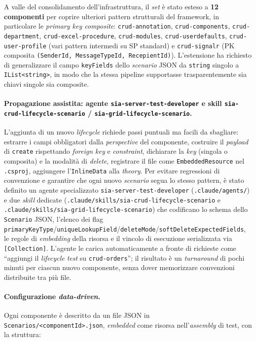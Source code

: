 A valle del consolidamento dell'infrastruttura, il \emph{set} è stato esteso a \textbf{12 componenti} per coprire ulteriori pattern strutturali del framework, in particolare le \emph{primary key composite}: \texttt{crud-annotation}, \texttt{crud-components}, \texttt{crud-department}, \texttt{crud-excel-procedure}, \texttt{crud-modules}, \texttt{crud-userdefaults}, \texttt{crud-user-profile} (vari pattern intermedi su SP standard) e \texttt{crud-signalr} (PK composita \texttt{(SenderId, MessageTypeId, RecepientId)}). L'estensione ha richiesto di generalizzare il campo \texttt{keyFields} dello \emph{scenario} JSON da \texttt{string} singolo a \texttt{IList<string>}, in modo che la stessa pipeline supportasse trasparentemente sia chiavi singole sia composite.

\paragraph{Propagazione assistita: agente \texttt{sia-server-test-developer} e skill \texttt{sia-crud-lifecycle-scenario} / \texttt{sia-grid-lifecycle-scenario}.} L'aggiunta di un nuovo \emph{lifecycle} richiede passi puntuali ma facili da sbagliare: estrarre i campi obbligatori dalla \emph{perspective} del componente, costruire il \emph{payload} di \texttt{create} rispettando \emph{foreign key} e \emph{constraint}, dichiarare la \emph{key} (singola o composita) e la modalità di \emph{delete}, registrare il file come \texttt{EmbeddedResource} nel \texttt{.csproj}, aggiungere l'\texttt{InlineData} alla \emph{theory}. Per evitare regressioni di convenzione e garantire che ogni nuovo \emph{scenario} segua lo stesso pattern, è stato definito un agente specializzato \texttt{sia-server-test-developer} (\texttt{.claude/agents/}) e due \emph{skill} dedicate (\texttt{.claude/skills/sia-crud-lifecycle-scenario} e \texttt{.claude/skills/sia-grid-lifecycle-scenario}) che codificano lo schema dello \texttt{Scenario} JSON, l'elenco dei flag \texttt{primaryKeyType}/\texttt{uniqueLookupField}/\texttt{deleteMode}/\texttt{softDeleteExpectedFields}, le regole di \emph{embedding} della risorsa e il vincolo di esecuzione serializzata via \texttt{[Collection]}. L'agente le carica automaticamente a fronte di richieste come ``aggiungi il \emph{lifecycle test} su \texttt{crud-orders}''; il risultato è un \emph{turnaround} di pochi minuti per ciascun nuovo componente, senza dover memorizzare convenzioni distribuite tra più file.

\paragraph{Configurazione \emph{data-driven}.} Ogni componente è descritto da un file JSON in \texttt{Scenarios/<componentId>.json}, \emph{embedded} come risorsa nell'\emph{assembly} di test, con la struttura:

